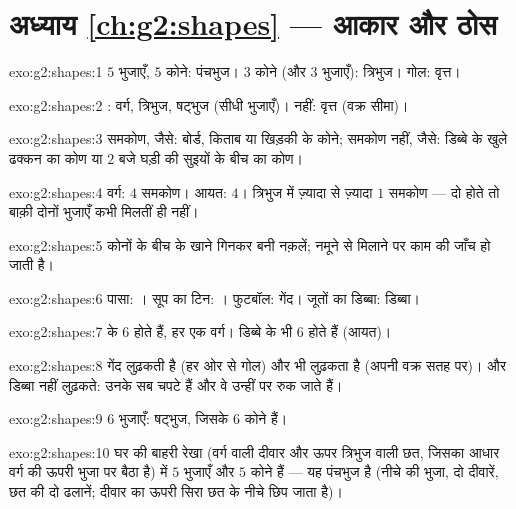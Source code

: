 \section*{अध्याय \ref{ch:g2:shapes} --- आकार और ठोस}

\begin{solution}{exo:g2:shapes:1}
$5$ भुजाएँ, $5$ कोने: पंचभुज। $3$ कोने (और $3$ भुजाएँ):
त्रिभुज। गोल: वृत्त।
\end{solution}

\begin{solution}{exo:g2:shapes:2}
: वर्ग, त्रिभुज, षट्भुज (सीधी भुजाएँ)।  नहीं:
वृत्त (वक्र सीमा)।
\end{solution}

\begin{solution}{exo:g2:shapes:3}
समकोण, जैसे: बोर्ड, किताब या खिड़की के कोने; समकोण नहीं, जैसे:
डिब्बे के खुले ढक्कन का कोण या $2$ बजे घड़ी की सुइयों के बीच
का कोण।
\end{solution}

\begin{solution}{exo:g2:shapes:4}
वर्ग: $4$ समकोण। आयत: $4$। त्रिभुज में ज़्यादा से ज़्यादा
$1$ समकोण --- दो होते तो बाक़ी दोनों भुजाएँ कभी मिलतीं ही
नहीं।
\end{solution}

\begin{solution}{exo:g2:shapes:5}
कोनों के बीच के खाने गिनकर बनी नक़लें; नमूने से मिलाने पर काम
की जाँच हो जाती है।
\end{solution}

\begin{solution}{exo:g2:shapes:6}
पासा: । सूप का टिन: । फुटबॉल: गेंद। जूतों का डिब्बा: डिब्बा।
\end{solution}

\begin{solution}{exo:g2:shapes:7}
 के $6$  होते हैं, हर एक वर्ग। डिब्बे के भी $6$  होते
हैं (आयत)।
\end{solution}

\begin{solution}{exo:g2:shapes:8}
गेंद लुढ़कती है (हर ओर से गोल) और  भी लुढ़कता है (अपनी वक्र
सतह पर)।  और डिब्बा नहीं लुढ़कते: उनके सब  चपटे हैं और वे
उन्हीं पर रुक जाते हैं।
\end{solution}

\begin{solution}{exo:g2:shapes:9}
$6$ भुजाएँ: षट्भुज, जिसके $6$ कोने हैं।
\end{solution}

\begin{solution}{exo:g2:shapes:10}
घर की बाहरी रेखा (वर्ग वाली दीवार और ऊपर त्रिभुज वाली छत, जिसका
आधार वर्ग की ऊपरी भुजा पर बैठा है) में $5$ भुजाएँ और $5$ कोने
हैं --- यह पंचभुज है (नीचे की भुजा, दो दीवारें, छत की दो ढलानें;
दीवार का ऊपरी सिरा छत के नीचे छिप जाता है)।
\end{solution}

